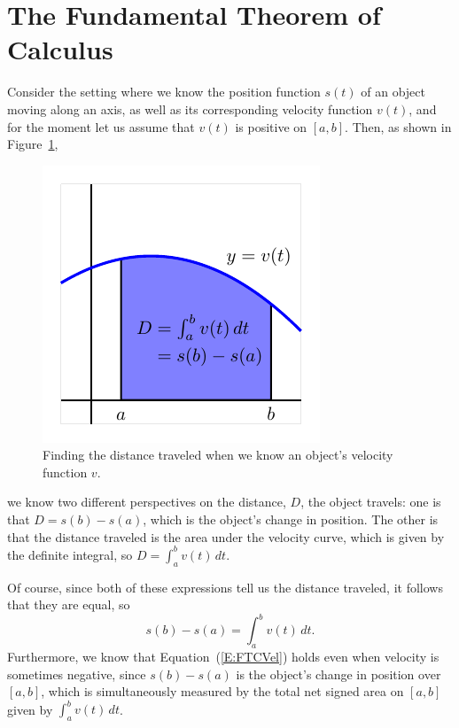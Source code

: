 \section{The Fundamental Theorem of Calculus}\label{sec:FTC}
Consider the setting where we know the position function $s(t)$ of an object moving along an axis, as well as its corresponding velocity function $v(t)$, and for the moment let us assume that $v(t)$ is positive on $[a,b]$.  Then, as shown in Figure~\ref{F:4.4.FTCVel},
\begin{figure}[h]
\begin{center}
\includegraphics{figures/4_4_FTCVel}
\caption{Finding the distance traveled when we know an object's velocity function $v$.} \label{F:4.4.FTCVel}
\end{center}
\end{figure}
we know two different perspectives on the distance, $D$, the object travels: one is that $D = s(b) - s(a)$, which is the object's change in position.  The other is that the distance traveled is the area under the velocity curve, which is given by the definite integral, so $D = \int_a^b v(t) \, dt$.

Of course, since both of these expressions tell us the distance traveled, it follows that they are equal, so
\begin{equation} \label{E:FTCVel}
s(b) - s(a) = \int_a^b v(t) \, dt.
\end{equation}
Furthermore, we know that Equation~(\ref{E:FTCVel}) holds even when velocity is sometimes negative, since $s(b) - s(a)$ is the object's change in position over $[a,b]$, which is simultaneously measured by the total net signed area on $[a,b]$ given by $\int_a^b v(t) \, dt$.


